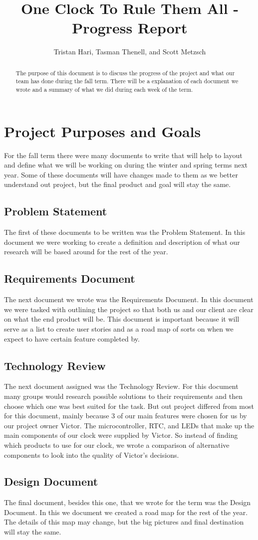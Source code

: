 \documentclass[10pt,draftclsnofoot,onecolumn]{IEEEtran}
\begin{document}
\title{One Clock To Rule Them All - Progress Report}
\author{Tristan Hari, Tasman Thenell, and Scott Metzsch}
\maketitle
\begin{abstract}
The purpose of this document is to discuss the progress of the project and what our team has done during the fall term.
There will be a explanation of each document we wrote and a summary of what we did during each week of the term.
\end{abstract}

\newpage

\section{Project Purposes and Goals}
For the fall term there were many documents to write that will help to layout and define what we will be working on during the winter and spring terms next year.
Some of these documents will have changes made to them as we better understand out project, but the final product and goal will stay the same. 
\subsection{Problem Statement}
The first of these documents to be written was the Problem Statement. 
In this document we were working to create a definition and description of what our research will be based around for the rest of the year. 
\subsection{Requirements Document}
The next document we wrote was the Requirements Document.
In this document we were tasked with outlining the project so that both us and our client are clear on what the end product will be.
This document is important because it will serve as a list to create user stories and as a road map of sorts on when we expect to have certain feature completed by. 
\subsection{Technology Review}
The next document assigned was the Technology Review. 
For this document many groups would research possible solutions to their requirements and then choose which one was best suited for the task. 
But out project differed from most for this document, mainly because 3 of our main features were chosen for us by our project owner Victor.
The microcontroller, RTC, and LEDs that make up the main components of our clock were supplied by Victor.
So instead of finding which products to use for our clock, we wrote a comparison of alternative components to look into the quality of Victor's decisions. 
\subsection{Design Document}
The final document, besides this one, that we wrote for the term was the Design Document.
In this we document we created a road map for the rest of the year. 
The details of this map may change, but the big pictures and final destination will stay the same. 
\end{document}

